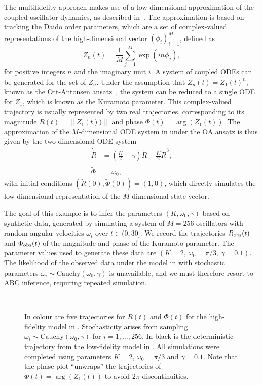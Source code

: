 \documentclass[review,demo]{siamonline190516}
\begin{document}
The multifidelity approach makes use of a low-dimensional approximation of the coupled oscillator dynamics, as described in~\cite{Hannay2018,Ott2008,Ott2009}.
The approximation is based on tracking the Daido order parameters, which are a set of complex-valued representations of the high-dimensional vector $(\phi_i)_{i=1}^M$, defined as
\[
 Z_n(t) = \frac{1}{M} \sum_{j=1}^M \exp( i n \phi_j),
\]
for positive integers $n$ and the imaginary unit $i$.
A system of coupled ODEs can be generated for the set of $Z_n$.
Under the assumption that $Z_n(t) = Z_1(t)^n$, known as the Ott-Antonsen ansatz~\cite{Hannay2018,Ott2008}, the system can be reduced to a single ODE for $Z_1$, which is known as the Kuramoto parameter.
This complex-valued trajectory is usually represented by two real trajectories, corresponding to its magnitude $R(t) = \| Z_1(t)) \|$ and phase $\Phi(t) = \arg(Z_1(t))$.
The approximation of the $M$-dimensional ODE system in  under the OA ansatz is thus given by the two-dimensional ODE system
\begin{subequations}
\label{eq:Kuramoto_lo}
\begin{align}
 \dot{\tilde R} &= \left( \frac{K}{2} - \gamma \right) \tilde R - \frac{K}{2} \tilde R^3, \\
 \dot{\tilde \Phi} &= \omega_0,
\end{align}
\end{subequations}
with initial conditions $(\tilde R(0), \tilde \Phi(0)) = (1, 0)$, which directly simulates the low-dimensional representation of the $M$-dimensional state vector.

The goal of this example is to infer the parameters $(K, \omega_0, \gamma)$ based on synthetic data, generated by simulating a system of $M=256$ oscillators with random angular velocities $\omega_i$ over $t \in (0, 30]$.
We record the trajectories $R_{\mathrm{obs}}(t)$ and $\Phi_{\mathrm{obs}}(t)$ of the magnitude and phase of the Kuramoto parameter.
The parameter values used to generate these data are $(K=2,~\omega_0 = \pi/3,~\gamma=0.1)$.
The likelihood of the observed data under the model in  with stochastic parameters $\omega_i \sim \mathrm{Cauchy}(\omega_0, \gamma)$ is unavailable, and we must therefore resort to ABC inference, requiring repeated simulation.

\begin{figure}
    \centering
    ~
    \caption{
    In colour are five trajectories for $R(t)$ and $\Phi(t)$ for the high-fidelity model in . Stochasticity arises from sampling $\omega_i \sim \mathrm{Cauchy}(\omega_0, \gamma)$ for $i = 1,\dots, 256$. 
    In black is the deterministic trajectory from the low-fidelity model in .
    All simulations were completed using parameters $K=2$, $\omega_0 = \pi/3$ and $\gamma=0.1$.
    Note that the phase plot ``unwraps'' the trajectories of $\Phi(t) = \arg(Z_1(t))$ to avoid $2\pi$-discontinuities. 
    }
    \label{fig:eg_dynamics}
\end{figure}
\end{document}
